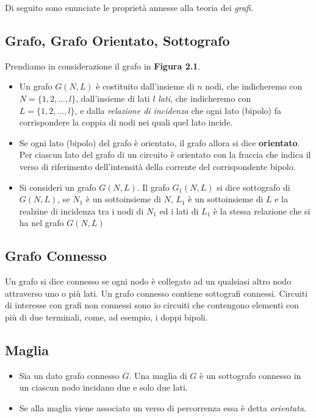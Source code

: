 \documentclass[a4paper]{report}
\begin{document}
Di seguito sono enunciate le propriet\`a annesse alla teoria dei \emph{grafi}.
\subsection{Grafo, Grafo Orientato, Sottografo}
Prendiamo in considerazione il grafo in {\bf Figura 2.1}.

\begin{itemize}
  \item Un grafo $G(N, L)$ \`e costituito dall'insieme di $n$ nodi, che
    indicheremo con $N=\{1, 2,..., l\}$, dall'insieme di lati $l$
    \emph{lati}, che indicheremo con \\$L=\{1, 2,..., l\}$, e dalla
    \emph{relazione di incidenza} che ogni lato (bipolo) fa
    corrispondere la coppia di nodi nei quali quel lato incide.
  \item Se ogni lato (bipolo) del grafo \`e orientato, il grafo allora
    si dice {\bf orientato}. Per ciascun lato del grafo di un circuito
    \`e orientato con la fraccia che indica il verso di riferimento
    dell'intensit\`a della corrente del corrispondente bipolo.
  \item Si consideri un grafo $G(N, L)$. Il grafo $G_1(N, L)$ si dice
    sottografo di $G(N, L)$, se $N_1$ \`e un sottoinsieme di $N$,
    $L_1$ \`e un sottoinsieme di $L$ e la realzine di incidenza tra i
    nodi di $N_1$ ed i lati di $L_1$ \`e la stessa relazione che si ha
    nel grafo $G(N, L)$
\end{itemize}

\subsection{Grafo Connesso}

Un grafo si dice connesso se ogni nodo \`e collegato ad un qualsiasi
altro nodo attraverso uno o pi\`u lati.
Un grafo connesso contiene sottografi connessi. Circuiti di interesse
con grafi non connessi sono io circuiti che contengono elementi con
pi\`u di due terminali, come, ad esempio, i doppi bipoli.

\subsection{Maglia}
\begin{itemize}
\item Sia un dato grafo connesso $G$. Una maglia di $G$ \`e un sottografo
  connesso in un ciascun nodo incidano due e solo due lati.
\item Se alla maglia viene associato un verso di percorrenza essa \`e
  detta \emph{orientata}.
\end{itemize}
\end{document}
